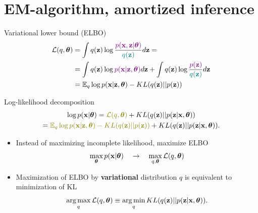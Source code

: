 	\section{EM-algorithm, amortized inference}
	\begin{frame}{Variational lower bound (ELBO)}
		\vspace{-0.3cm}
		\begin{align*}
			\mathcal{L} (q, \boldsymbol{\theta}) &= \int q(\mathbf{z}) \log \frac{\color{violet}p(\mathbf{x}, \mathbf{z} | \boldsymbol{\theta})}{\color{teal}q(\mathbf{z})}d\mathbf{z} = \\ 
			&= \int q(\mathbf{z}) \log {\color{violet}p(\mathbf{x}| \mathbf{z}, \boldsymbol{\theta})} d\mathbf{z} + \int q(\mathbf{z}) \log \frac{\color{violet}p(\mathbf{z})}{\color{teal}q(\mathbf{z})}d\mathbf{z} \\ 
			&= \mathbb{E}_{q} \log p(\mathbf{x} | \mathbf{z}, \boldsymbol{\theta}) - KL (q(\mathbf{z}) || p(\mathbf{z}))
		\end{align*}
		\vspace{-0.5cm}
		\begin{block}{Log-likelihood decomposition}
			\vspace{-0.8cm}
			\begin{multline*}
				\log p(\bx| \btheta) = {\color{olive}\mathcal{L} (q, \btheta)} + KL(q(\bz) || p(\bz|\bx, \btheta)) \\ = {\color{olive}\mathbb{E}_{q} \log p(\bx | \bz, \btheta) - KL (q(\bz) || p(\bz))} + KL(q(\bz) || p(\bz|\bx, \btheta)).
			\end{multline*}
			\vspace{-0.7cm}
		\end{block}
		\begin{itemize}
			\item Instead of maximizing incomplete likelihood, maximize ELBO
			\[
			\max_{\boldsymbol{\theta}} p(\mathbf{x} | \boldsymbol{\theta}) \quad \rightarrow \quad \max_{q, \boldsymbol{\theta}} \mathcal{L} (q, \boldsymbol{\theta})
			\]
			\item Maximization of ELBO by \textbf{variational} distribution $q$ is equivalent to minimization of KL
			\[
			\operatorname*{arg\,max}_q \mathcal{L} (q, \boldsymbol{\theta}) \equiv \operatorname*{arg\,min}_q KL(q(\mathbf{z}) || p(\mathbf{z}|\mathbf{x}, \boldsymbol{\theta})).
			\]
		\end{itemize}
		
	\end{frame}
